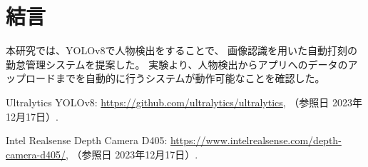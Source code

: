 \documentclass[10pt]{jarticle}
\begin{document}
    \section{結\hspace{2zw}言}%
本研究では、YOLOv8で人物検出をすることで、
画像認識を用いた自動打刻の勤怠管理システムを提案した。
実験より、人物検出からアプリへのデータのアップロードまでを自動的に行うシステムが動作可能なことを確認した。

    \vspace{5truemm}
    {\footnotesize
        \begin{thebibliography}{99}

            Ultralytics YOLOv8: 
            \url{https://github.com/ultralytics/ultralytics}, 
            （参照日 2023年12月17日）.

            Intel Realsense Depth Camera D405: 
            \url{https://www.intelrealsense.com/depth-camera-d405/}, 
            （参照日 2023年12月17日）.

        \end{thebibliography}
    }
    \normalsize
\end{document}
